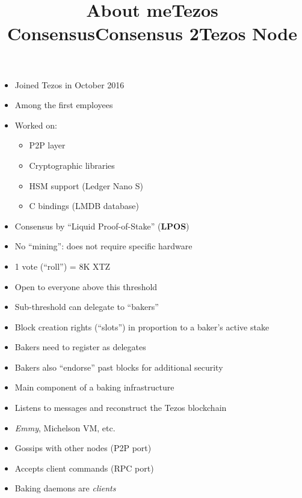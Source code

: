 \documentclass{slides}
\begin{document}
\maketitle

\begin{slide}
  \title{About me}
  \begin{itemize}
    \item Joined Tezos in October 2016
    \item Among the first employees
    \item Worked on:
      \begin{itemize}
        \item P2P layer
        \item Cryptographic libraries
        \item HSM support (Ledger Nano S)
        \item C bindings (LMDB database)
      \end{itemize}
  \end{itemize}
\end{slide}

\begin{slide}
  \title{Tezos Consensus}
  \begin{itemize}
  \item Consensus by “Liquid Proof-of-Stake” (\textbf{LPOS})
  \item No “mining”: does not require specific hardware
  \item 1 vote (“roll”) = 8K XTZ
  \item Open to everyone above this threshold
  \item Sub-threshold can delegate to “bakers”
  \end{itemize}
\end{slide}

\begin{slide}
  \title{Consensus 2}
  \begin{itemize}
  \item Block creation rights (“slots”) in proportion to a baker's
    active stake
  \item Bakers need to register as delegates
  \item Bakers also “endorse” past blocks for additional security
  \end{itemize}
\end{slide}

\begin{slide}
  \title{Tezos Node}
  \begin{itemize}
  \item Main component of a baking infrastructure
  \item Listens to messages and reconstruct the Tezos blockchain
  \item \emph{Emmy}, Michelson VM, etc.
  \item Gossips with other nodes (P2P port)
  \item Accepts client commands (RPC port)
  \item Baking daemons are \emph{clients}
  \end{itemize}
\end{slide}
\end{document}
